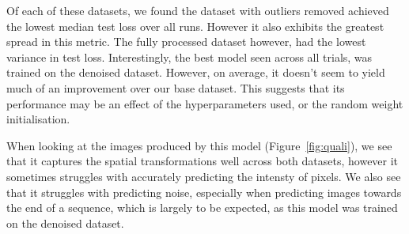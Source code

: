 \documentclass[twocolumn]{article}
\begin{document}
Of each of these datasets, we found the dataset with outliers removed achieved the lowest median test loss over all runs. However it also exhibits the greatest spread in this metric. The fully processed dataset however, had the lowest variance in test loss. Interestingly, the best model seen across all trials, was trained on the denoised dataset. However, on average, it doesn't seem to yield much of an improvement over our base dataset. This suggests that its performance may be an effect of the hyperparameters used, or the random weight initialisation. 

When looking at the images produced by this model (Figure~\ref{fig:quali}), we see that it captures the spatial transformations well across both datasets, however it sometimes struggles with accurately predicting the intensty of pixels. We also see that it struggles with predicting noise, especially when predicting images towards the end of a sequence, which is largely to be expected, as this model was trained on the denoised dataset. 
\end{document}
